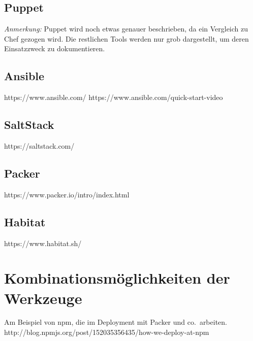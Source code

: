 \subsection{Puppet}
\label{sub:puppet}
\emph{Anmerkung:} Puppet wird noch etwas genauer beschrieben, da ein Vergleich zu Chef gezogen wird. Die restlichen Tools werden nur grob dargestellt, um deren Einsatzzweck zu dokumentieren.

\subsection{Ansible}
\label{sub:ansible}
https://www.ansible.com/
https://www.ansible.com/quick-start-video

\subsection{SaltStack}
\label{sub:saltstack}
https://saltstack.com/

\subsection{Packer}
\label{sub:packer}
https://www.packer.io/intro/index.html

\subsection{Habitat}
\label{sub:habitat}
https://www.habitat.sh/


\section{Kombinationsmöglichkeiten der Werkzeuge}
\label{sec:werkzeugkombinationsmoeglichkeiten}
Am Beispiel von npm, die im Deployment mit Packer und co.\ arbeiten.
http://blog.npmjs.org/post/152035356435/how-we-deploy-at-npm
